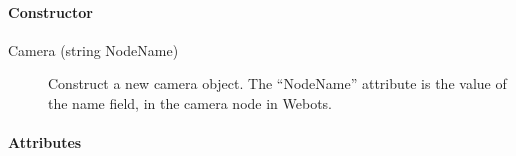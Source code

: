 \paragraph{Constructor}
\label{webots.uobjects.robotdevices.camera.constructor}%

\noindent
\begin{description}
\item[{Camera (string NodeName)}] Construct a new camera object. The ``NodeName'' attribute is the value
          of the name field, in the camera node in Webots.

\end{description}

\paragraph{Attributes}
\label{webots.uobjects.robotdevices.camera.attributes}%


